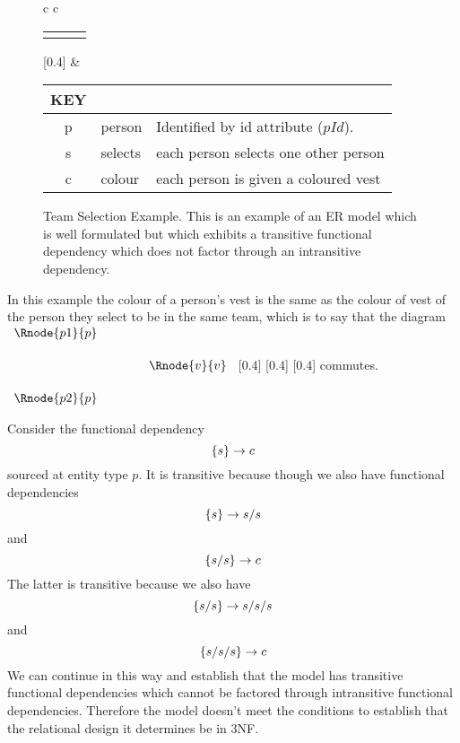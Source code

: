\begin{figure} [h]
\begin{center}
\begin{tabular}{c c}
\begin{tabular}{c p{1.5cm} c}
   \Rnode{p}{p} & & \Rnode{v}{v}
\end{tabular}
[0.4]
\idcomp
& \footnotesize
\begin{tabular}{c p{1.5cm} p{4cm}}
KEY && \\
\hline
p & person & Identified by id attribute ($pId$). \\
s & selects & each person selects one other person \\
c & colour & each person is given a coloured vest 
\end{tabular} 
\end{tabular}
\end{center}
\caption{Team Selection Example. This is an example of an ER model 
which is well formulated but which exhibits a transitive functional dependency which does not factor through an intransitive dependency.
}
\label{teamselectionexample}
\end{figure}

In this example the colour of a person's vest is the same as the 
colour of vest of the person they select to be in the same team, which is to say that  the diagram
$
\begin{array}{c p{0.75cm} c}
   \Rnode{p1}{p}  & &                  \\[0.5cm]
	                 & &    \Rnode{v}{v} \\[0.5cm]
   \Rnode{p2}{p}  & &
			
\end{array}
$
[0.4]
[0.4]
[0.4]
commutes. 


Consider the functional dependency
\begin{equation*}
\left\{s\right\} \rightarrow c
\end{equation*}
sourced at entity type $p$. It is transitive
because though we also have functional dependencies
\begin{equation*}
\left\{s\right\} \rightarrow s/s
\end{equation*}
and
\begin{equation*}
\left\{s/s\right\} \rightarrow c
\end{equation*}
The latter is transitive because we also have
\begin{equation*}
\left\{s/s\right\} \rightarrow s/s/s
\end{equation*}
and
\begin{equation*}
\left\{s/s/s\right\} \rightarrow c 
\end{equation*} 
We can continue in this way and establish that the model has transitive functional dependencies which cannot be factored 
through intransitive functional dependencies. Therefore the model doesn't meet
the conditions to establish that the relational design it determines  be
in 3NF.


